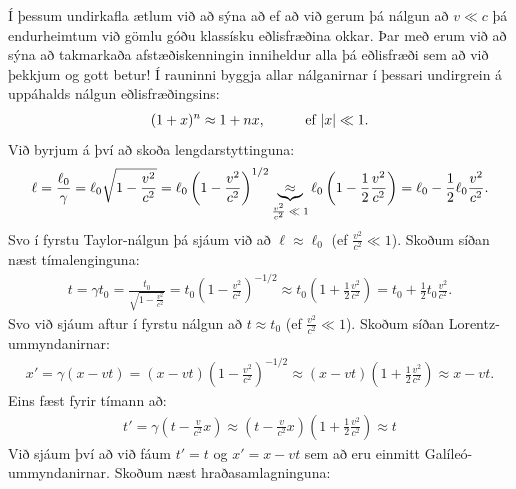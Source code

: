 \ifdefined \wholebook \else\documentclass[oneside]{book}\usepackage{EdlBook}\graphicspath{{figures/}}
\begin{document}
Í þessum undirkafla ætlum við að sýna að ef að við gerum þá nálgun að $v \ll c$ þá endurheimtum við gömlu góðu klassísku eðlisfræðina okkar. Þar með erum við að sýna að takmarkaða afstæðiskenningin inniheldur alla þá eðlisfræði sem að við þekkjum og gott betur! Í rauninni byggja allar nálganirnar í þessari undirgrein á uppáhalds nálgun eðlisfræðingsins:
\begin{align*}
    (1 + x)^n \approx 1 + nx, \hspace{1cm} \text{ef $\abs{x} \ll 1$}.
\end{align*}
Við byrjum á því að skoða lengdarstyttinguna:
\begin{align*}
    \ell = \frac{\ell_0}{\gamma} = \ell_0 \sqrt{1 - \frac{v^2}{c^2}} = \ell_0 \left( 1 - \frac{v^2}{c^2} \right)^{1/2} \underbrace{\approx}_\textrm{$\frac{v^2}{c^2} \ll 1$} \ell_0 \left( 1 - \frac{1}{2} \frac{v^2}{c^2} \right) = \ell_0 - \frac{1}{2}\ell_0 \frac{v^2}{c^2}. 
\end{align*}
Svo í fyrstu Taylor-nálgun þá sjáum við að $\ell \approx \ell_0$ (ef $\frac{v^2}{c^2} \ll 1$). Skoðum síðan næst tímalenginguna:
\begin{align*}
    t = \gamma t_0 = \frac{t_0}{\sqrt{1 - \frac{v^2}{c^2}}} = t_0\left( 1 - \frac{v^2}{c^2} \right)^{-1/2} \approx t_0 \left( 1  + \frac{1}{2} \frac{v^2}{c^2}  \right) = t_0 + \frac{1}{2}t_0 \frac{v^2}{c^2}. 
\end{align*}
Svo við sjáum aftur í fyrstu nálgun að $t \approx t_0$ (ef $\frac{v^2}{c^2} \ll 1$). Skoðum síðan Lorentz-ummyndanirnar:
\begin{align*}
    x' = \gamma \left( x - vt \right) = \left( x - vt \right)\left(1 - \frac{v^2}{c^2} \right)^{-1/2} \approx \left( x - vt \right)\left(1 + \frac{1}{2}\frac{v^2}{c^2} \right) \approx x- vt.
\end{align*}
Eins fæst fyrir tímann að:
\begin{align*}
    t' = \gamma \left( t - \frac{v}{c^2}x \right) \approx \left(t - \frac{v}{c^2}x \right)\left( 1 + \frac{1}{2}\frac{v^2}{c^2} \right) \approx t
\end{align*}
Við sjáum því að við fáum $t' = t$ og $x' = x- vt$ sem að eru einmitt Galíleó-ummyndanirnar. Skoðum næst hraðasamlagninguna:
\end{document}
